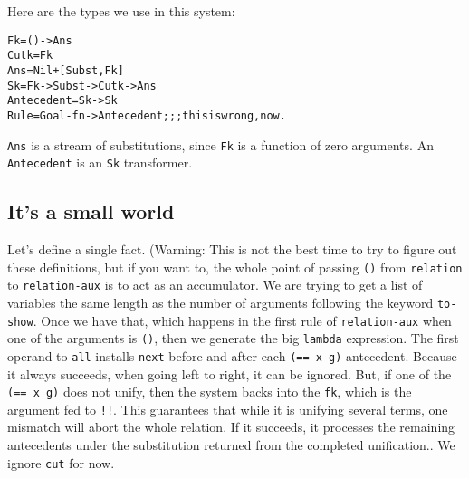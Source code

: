Here are the types we use in this system:

\begin{alltt}
                  Fk = () -> Ans
                Cutk = Fk
                 Ans = Nil + [Subst,Fk]
                  Sk = Fk -> Subst -> Cutk -> Ans
          Antecedent = Sk -> Sk
                Rule = Goal-fn -> Antecedent  ;;; this is wrong, now.
\end{alltt}

\texttt{Ans} is a stream of substitutions, since \texttt{Fk} is a
function of zero arguments. An \texttt{Antecedent} is an \texttt{Sk}
transformer.

\subsection{It's a small world}

Let's define a single fact. (Warning: This is not the best time to try
to figure out these definitions, but if you want to, the whole point
of passing \texttt{()} from \texttt{relation} to \texttt{relation-aux}
is to act as an accumulator.  We are trying to get a list of variables
the same length as the number of arguments following the keyword
\texttt{to-show}. Once we have that, which happens in the first rule
of \texttt{relation-aux} when one of the arguments is \texttt{()},
then we generate the big \texttt{lambda} expression.  The first
operand to \texttt{all} installs \texttt{next} before and after
each \texttt{(== x g)} antecedent.  Because it always succeeds,
when going left to right, it can be ignored.  But, if one of the
\texttt{(== x g)} does not unify, then the system backs into the
\texttt{fk}, which is the argument fed to \texttt{!!}. This guarantees
that while it is unifying several terms, one mismatch will abort
the whole relation.  If it succeeds, it processes the remaining
antecedents under the substitution returned from the completed
unification..  We ignore \texttt{cut} for now.

